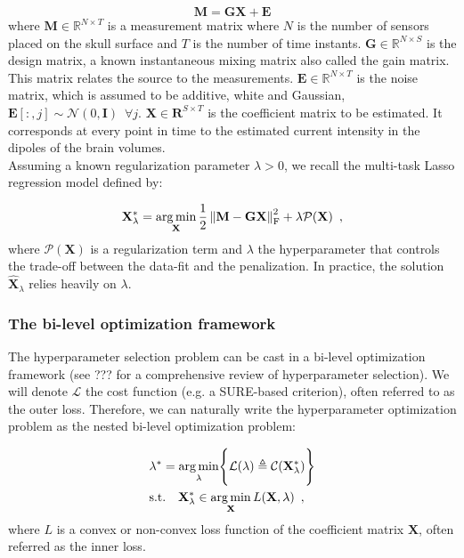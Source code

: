 \begin{equation}
    \mathbf{M = GX + E} 
\end{equation}
%
where $\mathbf{M} \in \mathbb{R}^{N \times T}$ is a measurement matrix where $N$ is the
number of sensors placed on the skull surface and $T$ is the number of time instants.
$\mathbf{G} \in \mathbb{R}^{N \times S}$ is the design matrix, a known 
instantaneous mixing matrix also called the gain matrix. This matrix relates the source
to the measurements. $\mathbf{E} \in \mathbb{R}^{N \times T}$ is the noise matrix, which
is assumed to be additive, white and Gaussian, $\mathbf{E}[:,j] \sim \mathcal{N}(0, \mathbf{I})
\enspace \forall j$. $\mathbf{X} \in \mathbf{R}^{S \times T}$ is the coefficient matrix to be estimated. 
It corresponds at every point in time to the estimated current intensity in the dipoles of
the brain volumes.
\\
Assuming a known regularization parameter $\lambda > 0$, we recall the multi-task
Lasso regression model defined by:

\begin{equation}
    \mathbf{X}_{\lambda}^* = \operatorname*{arg\,min}_{\mathbf{X}}
    \frac{1}{2}\left \lVert \mathbf{M - GX} \right \rVert^2_{\text{F}}
    + \lambda \mathcal{P}(\mathbf{X})
    \enspace ,
\end{equation}
%
where $\mathcal{P}(\mathbf{X})$ is a regularization term and $\lambda$ the hyperparameter
that controls the trade-off between the data-fit and the penalization. In practice, the solution
$\hat{\mathbf{X}}_{\lambda}$ relies heavily on $\lambda$.

\subsubsection{The bi-level optimization framework}

The hyperparameter selection problem can be cast in a bi-level optimization framework (see ???
for a comprehensive review of hyperparameter selection). We will denote $\mathcal{L}$ the cost function
(e.g. a SURE-based criterion), often referred to as the outer loss. Therefore, we can naturally write
the hyperparameter optimization problem as the nested bi-level optimization problem:

\begin{align*}
    &\lambda^* = \operatorname*{arg\,min}_{\lambda} 
    \Biggl\{
        \mathcal{L}(\lambda) 
        \triangleq 
        \mathcal{C}(\mathbf{X}_{\lambda}^*)
    \Biggr\} \\
    &\text{s.t.} \quad 
    \mathbf{X}_{\lambda}^* 
    \in 
    \operatorname*{arg\,min}_{\mathbf{X}} L(\mathbf{X}, \lambda)
    \enspace ,
\end{align*}
%
where $L$ is a convex or non-convex loss function of the coefficient matrix $\mathbf{X}$, 
often referred as the inner loss.

